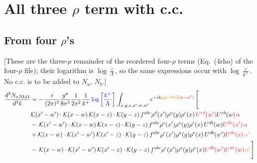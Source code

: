 \documentclass[9pt]{article}
\numberwithin{equation}{section}
\begin{document}
\section{All three $\rho$ term with c.c.}
\subsection{From four $\rho$'s} {\color{red}[These are the three-$\rho$ remainder of the reordered four-$\rho$ terms (Eq.~(4rho) of the four-$\rho$ file); their logarithm is $\log\frac{\vee}{\Lambda}$, so the same expressions occur with $\log\frac{\vee}{k^{+}}$. No c.c. is to be added to $N_{a}$, $N_{b}$.]}
\begin{align}
    \frac{d^{3}N_{a\,\rm NLO}}{d^{3}k} & = -\,\frac{i}{(2\pi)^{3}}\frac{g^{4}}{8\pi^{3}}\frac{1}{2\pi^{2}} \frac{1}{k^{+}}\,{\color{blue}\log{\left[\frac{k^{+}}{\Lambda}\right]}}\,\int_{x,y,z,x^{\prime},w,w^{\prime}}e^{-ik{\color{orange}\cancel{(w^{\prime}-w)}}{\color{red}(w-w^{\prime})}}\, \Bigg[\notag \\ &  \mathcal{K}(x'-w')\cdot \mathcal{K}(x-w)\, \mathcal{K}(x-z)\cdot \mathcal{K}(y-z)\, f^{a b c} \rho^{d}(x') \rho^{a}(y) \rho^{c}(x)\,{\color{red}U^{ed}(w')} U^{e b}(w)\, {\color{red} \alpha} \nonumber\\
    &  -\,\mathcal{K}(x'-w')\cdot \mathcal{K}(x-w)\, \mathcal{K}(x-z)\cdot \mathcal{K}(y-z)\, f^{a b c} \rho^{e}(x') \rho^{a}(y) \rho^{c}(x)\, U^{d b}(w) {\color{red}U^{de}(x')}\, {\color{red} \alpha}\nonumber\\
    & + \mathcal{K}(x-w)\cdot \mathcal{K}(x'-w')\, \mathcal{K}(x'-z)\cdot \mathcal{K}(y-z)\, f^{a b c} \rho^{c}(x') \rho^{a}(y) \rho^{e}(x)\,U^{d b}(w') {\color{red}U^{de}(x)}\, {\color{orange} \alpha'} \nonumber\\
    & -\,\mathcal{K}(x-w)\cdot \mathcal{K}(x'-w')\, \mathcal{K}(x'-z)\cdot \mathcal{K}(y-z)\, f^{a b c} \rho^{c}(x') \rho^{a}(y) \rho^{e}(x) {\color{red}U^{db}(w')} {\color{red}U^{de}(w)}\, {\color{orange} \alpha'}\Bigg]
\end{align}
\end{document}

